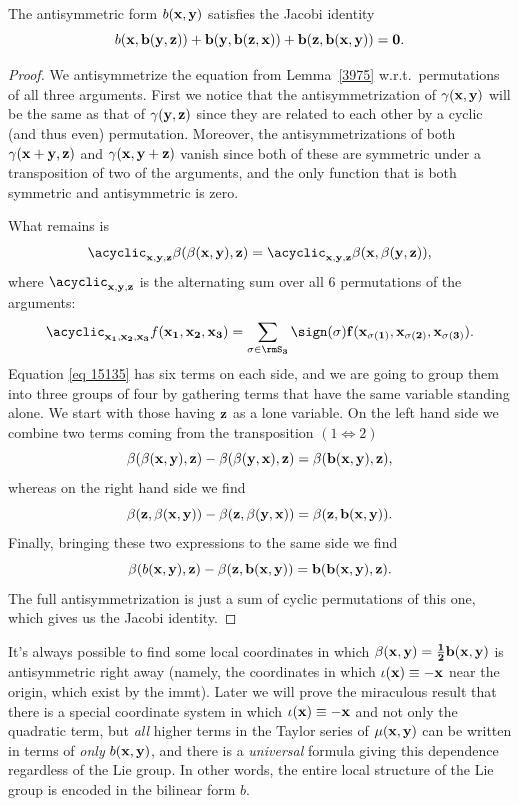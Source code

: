 \begin{lem}
    The antisymmetric form $b(\bf{x},\bf{y})$ satisfies the Jacobi identity
    \[b(\bf{x},b(\bf{y},\bf{z}))+b(\bf{y},b(\bf{z},\bf{x}))+b(\bf{z},b(\bf{x},\bf{y}))=0.\]
\end{lem}
\begin{proof}
    We antisymmetrize the equation from Lemma~\ref{3975} w.r.t.\ permutations of all three arguments. First we notice that the antisymmetrization of $\gamma(\bf{x},\bf{y})$ will be the same as that of $\gamma(\bf{y},\bf{z})$ since they are related to each other by a cyclic (and thus even) permutation. Moreover, the antisymmetrizations of both $\gamma(\bf{x}+\bf{y},\bf{z})$ and $\gamma(\bf{x},\bf{y}+\bf{z})$ vanish since both of these are symmetric under a transposition of two of the arguments, and the only function that is both symmetric and antisymmetric is zero.

    What remains is 
    \[\acyclic_{\bf x,\bf y,\bf z} \beta(\beta(\bf{x},\bf{y}),\bf{z})=\acyclic_{\bf x,\bf y,\bf z} \beta(\bf{x},\beta(\bf{y},\bf{z})),\label{eq 15135}\]
    where $\acyclic_{\bf x,\bf y,\bf z}$ is the alternating sum over all $6$ permutations of the arguments:
    \[\acyclic_{\bf x_1,\bf x_2,\bf x_3} f(\bf{x}_1,\bf{x}_2,\bf{x}_3)=\sum_{\sigma\in \rmS_3}\sign(\sigma)f(\bf{x}_{\sigma(1)},\bf{x}_{\sigma(2)},\bf{x}_{\sigma(3)}).\]
    Equation \eqref{eq 15135} has six terms on each side, and we are going to group them into three groups of four by gathering terms that have the same variable standing alone. We start with those having $\bf{z}$ as a lone variable. On the left hand side we combine two terms coming from the transposition $(1\Leftrightarrow2)$
    \[\beta(\beta(\bf{x},\bf{y}),\bf{z})-\beta(\beta(\bf{y},\bf{x}),\bf{z})=\beta(b(\bf{x},\bf{y}),\bf{z}),\]
    whereas on the right hand side we find
    \[\beta(\bf{z},\beta(\bf{x},\bf{y}))-\beta(\bf{z},\beta(\bf{y},\bf{x}))=\beta(\bf{z},b(\bf{x},\bf{y})).\]
    Finally, bringing these two expressions to the same side we find
    \[\beta(b(\bf{x},\bf{y}),\bf{z})-\beta(\bf{z},b(\bf{x},\bf{y}))=b(b(\bf{x},\bf{y}),\bf{z}).\]
    The full antisymmetrization is just a sum of cyclic permutations of this one, which gives us the Jacobi identity.
\end{proof}

\begin{rem}
    It's always possible to find some local coordinates in which $\beta(\bf{x},\bf{y})=\frac12 b(\bf{x},\bf{y})$ is antisymmetric right away (namely, the coordinates in which $\iota(\bf{x})\equiv -\bf{x}$ near the origin, which exist by the \gls{immt}). Later we will prove the miraculous result that there is a special coordinate system in which $\iota(\bf{x})\equiv-\bf{x}$ and not only the quadratic term, but \emph{all} higher terms in the Taylor series of $\mu(\bf{x},\bf{y})$ can be written in terms of \emph{only} $b(\bf{x},\bf{y})$, and there is a \emph{universal} formula giving this dependence regardless of the Lie group. In other words, the entire local structure of the Lie group is encoded in the bilinear form $b$.
\end{rem}



